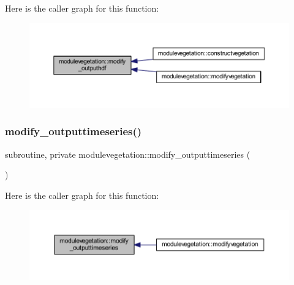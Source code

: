 Here is the caller graph for this function\+:\nopagebreak
\begin{figure}[H]
\begin{center}
\leavevmode
\includegraphics[width=350pt]{namespacemodulevegetation_ae3c35b12a954295511c0439076c44694_icgraph}
\end{center}
\end{figure}
\mbox{\label{namespacemodulevegetation_aca579929724e1ba027a5dedcca09f4f3}} 
\subsubsection{\texorpdfstring{modify\+\_\+outputtimeseries()}{modify\_outputtimeseries()}}
{\footnotesize\ttfamily subroutine, private modulevegetation\+::modify\+\_\+outputtimeseries (\begin{DoxyParamCaption}{ }\end{DoxyParamCaption})\hspace{0.3cm}{\ttfamily [private]}}

Here is the caller graph for this function\+:\nopagebreak
\begin{figure}[H]
\begin{center}
\leavevmode
\includegraphics[width=350pt]{namespacemodulevegetation_aca579929724e1ba027a5dedcca09f4f3_icgraph}
\end{center}
\end{figure}
\mbox{\label{namespacemodulevegetation_aa3811c1a240a54342243a4e460197d77}} 
